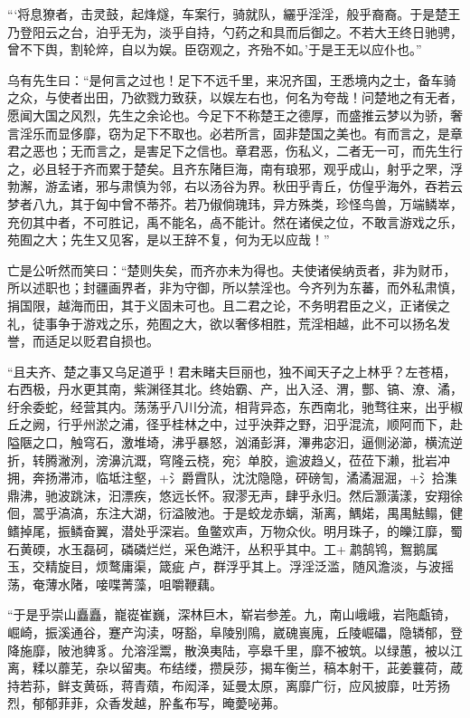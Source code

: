 \documentclass[12pt,UTF8]{ctexbook}
\begin{document}
“‘将息獠者，击灵鼓，起烽燧，车案行，骑就队，纚乎淫淫，般乎裔裔。于是楚王乃登阳云之台，泊乎无为，淡乎自持，勺药之和具而后御之。不若大王终日驰骋，曾不下舆，割轮焠，自以为娱。臣窃观之，齐殆不如。’于是王无以应仆也。”



乌有先生曰：“是何言之过也！足下不远千里，来况齐国，王悉境内之士，备车骑之众，与使者出田，乃欲戮力致获，以娱左右也，何名为夸哉！问楚地之有无者，愿闻大国之风烈，先生之余论也。今足下不称楚王之德厚，而盛推云梦以为骄，奢言淫乐而显侈靡，窃为足下不取也。必若所言，固非楚国之美也。有而言之，是章君之恶也；无而言之，是害足下之信也。章君恶，伤私义，二者无一可，而先生行之，必且轻于齐而累于楚矣。且齐东陼巨海，南有琅邪，观乎成山，射乎之罘，浮勃澥，游孟诸，邪与肃慎为邻，右以汤谷为界。秋田乎青丘，仿偟乎海外，吞若云梦者八九，其于匈中曾不蒂芥。若乃俶倘瑰玮，异方殊类，珍怪鸟兽，万端鳞崒，充仞其中者，不可胜记，禹不能名，卨不能计。然在诸侯之位，不敢言游戏之乐，苑囿之大；先生又见客，是以王辞不复，何为无以应哉！”



亡是公听然而笑曰：“楚则失矣，而齐亦未为得也。夫使诸侯纳贡者，非为财币，所以述职也；封疆画界者，非为守御，所以禁淫也。今齐列为东蕃，而外私肃慎，捐国限，越海而田，其于义固未可也。且二君之论，不务明君臣之义，正诸侯之礼，徒事争于游戏之乐，苑囿之大，欲以奢侈相胜，荒淫相越，此不可以扬名发誉，而适足以贬君自损也。



“且夫齐、楚之事又乌足道乎！君未睹夫巨丽也，独不闻天子之上林乎？左苍梧，右西极，丹水更其南，紫渊径其北。终始霸、产，出入泾、渭，酆、镐、潦、潏，纡余委蛇，经营其内。荡荡乎八川分流，相背异态，东西南北，驰骛往来，出乎椒丘之阙，行乎州淤之浦，径乎桂林之中，过乎泱莽之野，汩乎混流，顺阿而下，赴隘陿之口，触穹石，激堆埼，沸乎暴怒，汹涌彭湃，滭弗宓汩，逼侧泌瀄，横流逆折，转腾潎洌，滂濞沆溉，穹隆云桡，宛氵单胶，逾波趋乂，莅莅下濑，批岩冲拥，奔扬滞沛，临坻注壑，+氵爵霣队，沈沈隐隐，砰磅訇，潏潏淈淈，+氵拾潗鼎沸，驰波跳沫，汩漂疾，悠远长怀。寂漻无声，肆乎永归。然后灏潢漾，安翔徐佪，翯乎滈滈，东注大湖，衍溢陂池。于是蛟龙赤螭，渐离，鰅婼，禺禺魼鳎，健鳍掉尾，振鳞奋翼，潜处乎深岩。鱼鳖欢声，万物众伙。明月珠子，的皪江靡，蜀石黄碝，水玉磊砢，磷磷烂烂，采色澔汗，丛积乎其中。工+鹔鹄鸨，鴽鹅属玉，交精旋目，烦鹜庸渠，箴疵卢，群浮乎其上。浮淫泛滥，随风澹淡，与波摇荡，奄薄水陼，唼喋菁藻，咀嚼鞭藕。



“于是乎崇山矗矗，巃嵸崔巍，深林巨木，崭岩参差。九，南山峨峨，岩陁甗锜，崛崎，振溪通谷，蹇产沟渎，呀豁，阜陵别隝，崴磈嵔廆，丘陵崛礧，隐辚郁，登降施靡，陂池貏豸。允溶淫鬻，散涣夷陆，亭皋千里，靡不被筑。以绿蕙，被以江离，糅以蘼芜，杂以留夷。布结缕，攒戾莎，揭车衡兰，稿本射干，茈姜蘘荷，葴持若荪，鲜支黄砾，蒋青薠，布闳泽，延曼太原，离靡广衍，应风披靡，吐芳扬烈，郁郁菲菲，众香发越，肸蚃布写，晻薆咇茀。
\end{document}
